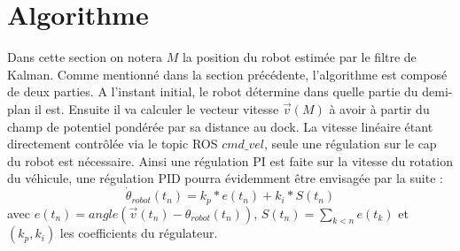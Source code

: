 \documentclass[12pt]{report}
\begin{document}
\section{Algorithme}

Dans cette section on notera $M$ la position du robot estimée par le filtre de Kalman. Comme mentionné dans la section précédente, l'algorithme est composé de deux parties. A l'instant initial, le robot détermine dans quelle partie du demi-plan il est. Ensuite il va calculer le vecteur vitesse $\overrightarrow{v}(M)$ à avoir à partir du champ de potentiel pondérée par sa distance au dock. La vitesse linéaire étant directement contrôlée via le topic ROS $cmd\_vel$, seule une régulation sur le cap du robot est nécessaire. Ainsi une régulation PI est faite sur la vitesse du rotation du véhicule, une régulation PID pourra évidemment être envisagée par la suite : 
\[\dot{\theta}_{robot}(t_n)=k_p*e(t_n)+k_i*S(t_n)\]
avec $e(t_n)=angle(\overrightarrow{v}(t_n)-\theta_{robot}(t_n))$, $S(t_n) = \sum_{k<n}{e(t_k)}$ et $(k_p,k_i)$ les coefficients du régulateur. 
\end{document}
